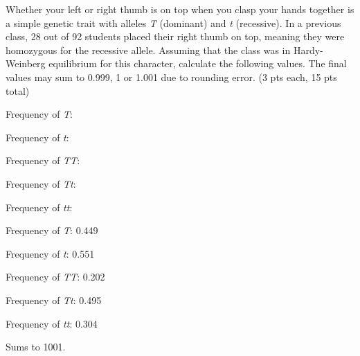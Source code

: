 
\question[15]
Whether your left or right thumb is on top when you clasp your hands together is a simple genetic trait with alleles \textit{T} (dominant) and \textit{t} (recessive).  In a previous class, 28 out of 92 students placed their right thumb on top, meaning they were homozygous for the recessive allele.  Assuming that the class was in Hardy-Weinberg equilibrium for this character, calculate the following values. The final values may sum to 0.999, 1 or 1.001 due to rounding error. (3 pts each, 15 pts total)

\vspace{2\baselineskip}
Frequency of \textit{T}:

\vspace{2\baselineskip}
Frequency of \textit{t}:

\vspace{2\baselineskip}
Frequency of \textit{TT}:

\vspace{2\baselineskip}
Frequency of \textit{Tt}:

\vspace{2\baselineskip}
Frequency of \textit{tt}: 

\begin{solution}

\vspace{2\baselineskip}
Frequency of \textit{T}: 0.449 

\vspace{2\baselineskip}
Frequency of \textit{t}: 0.551

\vspace{2\baselineskip}
Frequency of \textit{TT}: 0.202

\vspace{2\baselineskip}
Frequency of \textit{Tt}: 0.495

\vspace{2\baselineskip}
Frequency of \textit{tt}: 0.304

\vspace{\baselineskip}
Sums to 1001.

\end{solution}